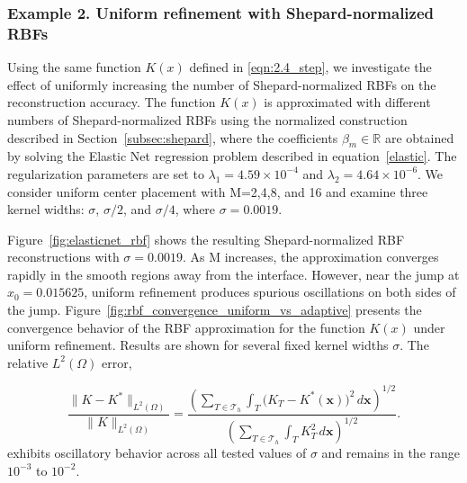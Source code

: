 \documentclass[final,1p,times]{elsarticle}
\theoremstyle{plain}
\theoremstyle{definition}
\theoremstyle{remark}
\newcommand{\bx}{\mathbf{x}}
\begin{document}
\subsubsection{Example 2. Uniform refinement with Shepard-normalized RBFs}

Using the same function $K(x)$ defined in \eqref{eqn:2.4_step}, we investigate the effect of uniformly increasing the number of Shepard-normalized RBFs on the reconstruction accuracy. The function $K(x)$ is approximated with different numbers of Shepard-normalized RBFs using the normalized construction described in Section~\ref{subsec:shepard}, where the coefficients $\beta_m \in \mathbb{R}$ are obtained by solving the Elastic Net regression problem described in equation~\eqref{elastic}. The regularization parameters are set to $\lambda_1 = 4.59 \times 10^{-4}$ and $\lambda_2 = 4.64 \times 10^{-6}$. We consider uniform center placement with M=2,4,8, and 16 and examine three kernel widths: $\sigma$, $\sigma/2$, and $\sigma/4$, where $\sigma=0.0019$. 

Figure{\color{red}~}\ref{fig:elasticnet_rbf} shows the resulting Shepard-normalized RBF reconstructions with $\sigma=0.0019$. As M increases, the approximation converges rapidly in the smooth regions away from the interface. However, near the jump at $x_0=0.015625$, uniform refinement produces spurious oscillations on both sides of the jump.    
Figure~\ref{fig:rbf_convergence_uniform_vs_adaptive} presents the convergence behavior of the RBF approximation for the function $K(x)$ under uniform refinement. Results are shown for several fixed kernel widths $\sigma$. The relative $L^2(\Omega)$ error,

\begin{equation}\label{eq:L2error}
\frac{\|K-K^*\|_{L^2(\Omega)}}{\|K\|_{L^2(\Omega)}}
=
\frac{\left(\sum_{T\in\mathcal{T}_h}\int_T \bigl(K_T-K^*(\bx)\bigr)^2\,d\bx\right)^{1/2}}
{\left(\sum_{T\in\mathcal{T}_h}\int_T K_T^2\,d\bx\right)^{1/2}}.
\end{equation}
exhibits oscillatory behavior across all tested values of $\sigma$ and remains in the range $10^{-3}$ to $10^{-2}$.
\end{document}
